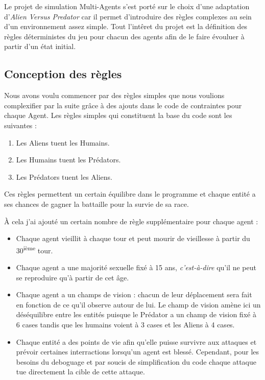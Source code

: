 Le projet de simulation Multi-Agents s'est porté sur le choix d'une adaptation d'\emph{Alien Versus Predator} car il permet d'introduire des règles complexes au sein d'un environnement assez simple. Tout l'intêret du projet est la définition des règles déterministes du jeu pour chacun des agents afin de le faire évouluer à partir d'un état initial.

\subsection{Conception des règles}

Nous avons voulu commencer par des règles simples que nous voulions complexifier par la suite grâce à des ajouts dans le code de contraintes pour chaque Agent. Les règles simples qui constituent la base du code sont les suivantes :
\begin{enumerate}
  \item Les Aliens tuent les Humains.
  \item Les Humains tuent les Prédators.
  \item Les Prédators tuent les Aliens.
\end{enumerate}

Ces règles permettent un certain équilibre dans le programme et chaque entité a ses chances de gagner la battaille pour la survie de sa race.

À cela j'ai ajouté un certain nombre de règle supplémentaire pour chaque agent :
\begin{itemize}
  \item Chaque agent vieillit à chaque tour et peut mourir de vieillesse à partir du 30\textsuperscript{ième} tour.
  \item Chaque agent a une majorité sexuelle fixé à 15 ans, \textit{c'est-à-dire} qu'il ne peut se reproduire qu'à partir de cet âge.
  \item Chaque agent a un champs de vision : chacun de leur déplacement sera fait en fonction de ce qu'il observe autour de lui. Le champ de vision amène ici un déséquilibre entre les entités puisque le Prédator a un champ de vision fixé à 6 cases tandis que les humains voient à 3 cases et les Aliens à 4 cases.
  \item Chaque entité a des points de vie afin qu'elle puisse survivre aux attaques et prévoir certaines interractions lorsqu'un agent est blessé. Cependant, pour les besoins du deboguage et par soucis de simplification du code chaque attaque tue directement la cible de cette attaque.
\end{itemize}

